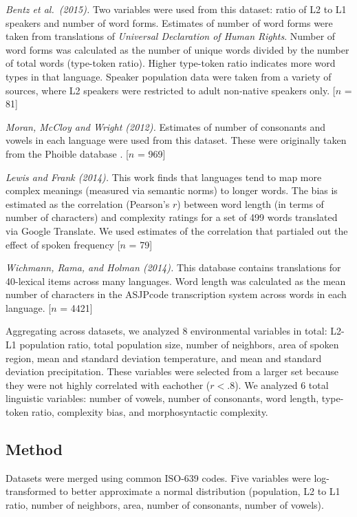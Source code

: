 \documentclass[10pt,letterpaper]{article}
\begin{document}
{\it Bentz et al.\ (2015).} Two variables were used from this dataset: ratio of L2 to L1 speakers and number of word forms. Estimates of number of word forms were taken from translations of  {\it Universal Declaration of Human Rights}. Number of word forms was calculated as the number of unique words divided by the number of total words (type-token ratio). Higher type-token ratio indicates more word types in that language. Speaker population data were taken from a variety of sources, where L2 speakers were restricted to adult non-native speakers only. [$n$ = 81]

{\it Moran, McCloy and Wright (2012).} Estimates of number of consonants and vowels in each language were used from this dataset. These were originally taken from the Phoible database \cite{phoible}. [$n$ = 969]

{\it Lewis and Frank (2014).} This work finds that languages tend to map more complex meanings (measured via semantic norms) to longer words. The bias is estimated as the correlation (Pearson's $r$) between word length (in terms of number of characters) and complexity ratings for a set of 499 words translated via Google Translate. We used estimates of the correlation that partialed out the effect of spoken frequency [$n$ = 79]

{\it Wichmann, Rama, and Holman (2014).} This database contains translations for 40-lexical items across many languages. Word length was calculated as the mean number of characters in the ASJPcode transcription system across words in each language. [$n$ = 4421]

Aggregating across datasets, we analyzed 8 environmental variables in total: L2-L1 population ratio, total population size, number of neighbors, area of spoken region, mean and standard deviation temperature, and mean and standard deviation precipitation. These variables were selected from a larger set because they were not highly correlated with eachother ($r<.8$). We analyzed 6 total linguistic variables: number of vowels, number of consonants, word length, type-token ratio, complexity bias, and morphosyntactic complexity.


\subsection{Method}
Datasets were merged using common ISO-639 codes. Five variables were log-transformed to better approximate a normal distribution (population, L2 to L1 ratio,  number of neighbors, area, number of consonants, number of vowels). 
\end{document}
